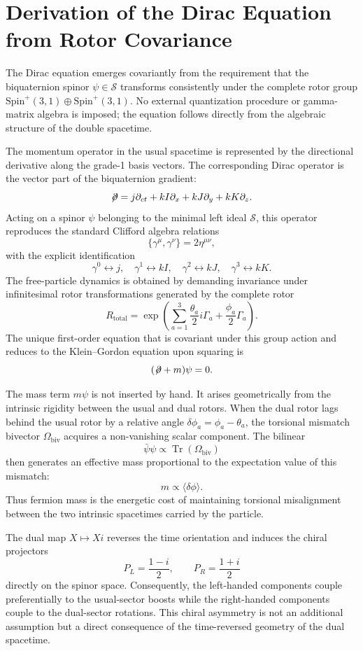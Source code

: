 \documentclass[dvipdfmx,11pt,a4paper]{article}
\begin{document}
\section{Derivation of the Dirac Equation from Rotor Covariance}
\label{sec:dirac}

The Dirac equation emerges covariantly from the requirement that the biquaternion spinor $\psi \in \mathcal{S}$ transforms consistently under the complete rotor group $\mathrm{Spin}^+(3,1) \oplus \mathrm{Spin}^+(3,1)$. No external quantization procedure or gamma-matrix algebra is imposed; the equation follows directly from the algebraic structure of the double spacetime.

The momentum operator in the usual spacetime is represented by the directional derivative along the grade-1 basis vectors. The corresponding Dirac operator is the vector part of the biquaternion gradient:
\[
\not\!\partial = j \partial_{ct} + kI \partial_x + kJ \partial_y + kK \partial_z.
\]
Acting on a spinor $\psi$ belonging to the minimal left ideal $\mathcal{S}$, this operator reproduces the standard Clifford algebra relations
\[
\{\gamma^\mu, \gamma^\nu\} = 2\eta^{\mu\nu},
\]
with the explicit identification
\[
\gamma^0 \leftrightarrow j, \quad \gamma^1 \leftrightarrow kI, \quad \gamma^2 \leftrightarrow kJ, \quad \gamma^3 \leftrightarrow kK.
\]
The free-particle dynamics is obtained by demanding invariance under infinitesimal rotor transformations generated by the complete rotor
\[
R_\text{total} = \exp\left( \sum_{a=1}^3 \frac{\theta_a}{2} i\Gamma_a + \frac{\phi_a}{2} \Gamma_a \right).
\]
The unique first-order equation that is covariant under this group action and reduces to the Klein--Gordon equation upon squaring is
\[
(\not\!\partial + m)\psi = 0.
\]

The mass term $m\psi$ is not inserted by hand. It arises geometrically from the intrinsic rigidity between the usual and dual rotors. When the dual rotor lags behind the usual rotor by a relative angle $\delta\phi_a = \phi_a - \theta_a$, the torsional mismatch bivector $\Omega_\text{biv}$ acquires a non-vanishing scalar component. The bilinear
\[
\bar{\psi}\psi \propto \operatorname{Tr}(\Omega_\text{biv})
\]
then generates an effective mass proportional to the expectation value of this mismatch:
\[
m \propto \langle \delta\phi \rangle.
\]
Thus fermion mass is the energetic cost of maintaining torsional misalignment between the two intrinsic spacetimes carried by the particle.

The dual map $X \mapsto X i$ reverses the time orientation and induces the chiral projectors
\[
P_L = \frac{1-i}{2}, \qquad P_R = \frac{1+i}{2}
\]
directly on the spinor space. Consequently, the left-handed components couple preferentially to the usual-sector boosts while the right-handed components couple to the dual-sector rotations. This chiral asymmetry is not an additional assumption but a direct consequence of the time-reversed geometry of the dual spacetime.
\end{document}
